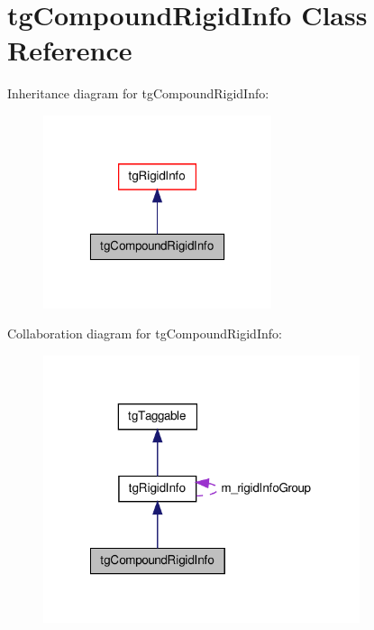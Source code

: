 \hypertarget{classtg_compound_rigid_info}{\section{tg\-Compound\-Rigid\-Info Class Reference}
\label{classtg_compound_rigid_info}
}


Inheritance diagram for tg\-Compound\-Rigid\-Info\-:\nopagebreak
\begin{figure}[H]
\begin{center}
\leavevmode
\includegraphics[width=190pt]{classtg_compound_rigid_info__inherit__graph}
\end{center}
\end{figure}


Collaboration diagram for tg\-Compound\-Rigid\-Info\-:\nopagebreak
\begin{figure}[H]
\begin{center}
\leavevmode
\includegraphics[width=263pt]{classtg_compound_rigid_info__coll__graph}
\end{center}
\end{figure}
